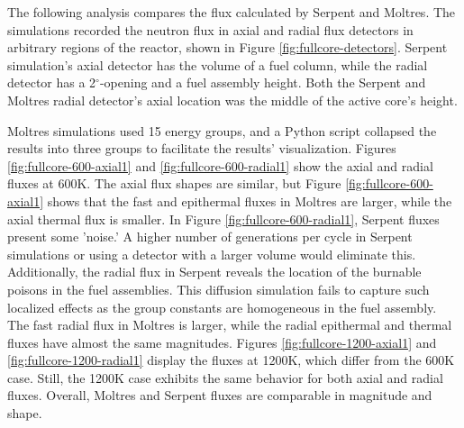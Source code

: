 The following analysis compares the flux calculated by Serpent and Moltres.
The simulations recorded the neutron flux in axial and radial flux detectors in arbitrary regions of the reactor, shown in Figure \ref{fig:fullcore-detectors}.
Serpent simulation's axial detector has the volume of a fuel column, while the radial detector has a 2$^{\circ}$-opening and a fuel assembly height.
Both the Serpent and Moltres radial detector's axial location was the middle of the active core's height.


Moltres simulations used 15 energy groups, and a Python script collapsed the results into three groups to facilitate the results' visualization.
Figures \ref{fig:fullcore-600-axial1} and \ref{fig:fullcore-600-radial1} show the axial and radial fluxes at 600K.
The axial flux shapes are similar, but Figure \ref{fig:fullcore-600-axial1} shows that the fast and epithermal fluxes in Moltres are larger, while the axial thermal flux is smaller.
In Figure \ref{fig:fullcore-600-radial1}, Serpent fluxes present some 'noise.'
A higher number of generations per cycle in Serpent simulations or using a detector with a larger volume would eliminate this.
Additionally, the radial flux in Serpent reveals the location of the burnable poisons in the fuel assemblies.
This diffusion simulation fails to capture such localized effects as the group constants are homogeneous in the fuel assembly.
The fast radial flux in Moltres is larger, while the radial epithermal and thermal fluxes have almost the same magnitudes.
Figures \ref{fig:fullcore-1200-axial1} and \ref{fig:fullcore-1200-radial1} display the fluxes at 1200K, which differ from the 600K case.
Still, the 1200K case exhibits the same behavior for both axial and radial fluxes.
Overall, Moltres and Serpent fluxes are comparable in magnitude and shape.

